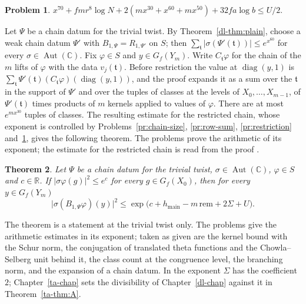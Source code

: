 \documentclass[reqno]{amsart}
\newcounter{chap}
\theoremstyle{definition}
\newtheorem{problem}{Problem}[section]
\theoremstyle{plain}
\newtheorem{theorem}[problem]{Theorem}
\theoremstyle{remark}
\newcommand{\R}{\mathbb{R}}
\newcommand{\C}{\mathbb{C}}
\newcommand{\rem}{\mathrm{rem}}
\newcommand{\hm}{h_{\mathrm{main}}}
\newcommand{\tr}{\mathfrak t}
\newcommand{\Aut}{\operatorname{Aut}}
\newcommand{\diag}{\operatorname{diag}}
\begin{document}
\begin{problem}\label{pr:scale-check}
\(x^{70} + fmr^8\log N + 2(mx^{30} + x^{60} + mx^{50}) + 32fa\log b \le U/2\).
\end{problem}

Let \(\Psi\) be a chain datum for the trivial twist.  By Theorem~\ref{dl-thm:plain}, choose a weak chain datum \(\Psi'\) with \(B_{1,\Psi} = R_{1,\Psi'}\) on \(S\); then \(\sum_{\tr}\lvert\sigma(\Psi'(\tr))\rvert \le e^{x^{60}}\) for every \(\sigma \in \Aut(\C)\).  Fix \(\varphi \in S\) and \(y \in G_f(Y_m)\).  Write \(C_{\tr}\varphi\) for the chain of the \(m\) lifts of \(\varphi\) with the data \(v_j(\tr)\).  Before restriction the value at \(\diag(y, 1)\) is \(\sum_{\tr}\Psi'(\tr)(C_{\tr}\varphi)(\diag(y, 1))\), and the proof expands it as a sum over the \(\tr\) in the support of \(\Psi'\) and over the tuples of classes at the levels of \(X_0, \dots, X_{m-1}\), of \(\Psi'(\tr)\) times products of \(m\) kernels applied to values of \(\varphi\).  There are at most \(e^{mx^{30}}\) tuples of classes.  The resulting estimate for the restricted chain, whose exponent is controlled by Problems~\ref{pr:chain-size}, \ref{pr:row-sum}, \ref{pr:restriction} and~\ref{pr:scale-check}, gives the following theorem.  The problems prove the arithmetic of its exponent; the estimate for the restricted chain is read from the proof \cite{GL}.

\begin{theorem}\label{thm:size}
Let \(\Psi\) be a chain datum for the trivial twist, \(\sigma \in \Aut(\C)\), \(\varphi \in S\) and \(c \in \R\).  If \(\lvert\sigma\varphi(g)\rvert^2 \le e^c\) for every \(g \in G_f(X_0)\), then for every \(y \in G_f(Y_m)\)
\[
  \lvert\sigma(B_{1,\Psi}\varphi)(y)\rvert^2 \le \exp\bigl(c + \hm - m\,\rem + 2\Sigma + U\bigr) .
\]
\end{theorem}

The theorem is a statement at the trivial twist only.  The problems give the arithmetic estimates in its exponent; taken as given are the kernel bound with the Schur norm, the conjugation of translated theta functions and the Chowla--Selberg unit behind it, the class count at the congruence level, the branching norm, and the expansion of a chain datum.  In the exponent \(\Sigma\) has the coefficient \(2\); Chapter~\ref{ta-chap} sets the divisibility of Chapter~\ref{dl-chap} against it in Theorem~\ref{ta-thm:A}.
\end{document}
